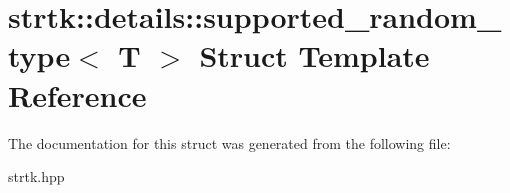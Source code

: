 \hypertarget{structstrtk_1_1details_1_1supported__random__type}{\section{strtk\-:\-:details\-:\-:supported\-\_\-random\-\_\-type$<$ T $>$ Struct Template Reference}
\label{structstrtk_1_1details_1_1supported__random__type}
}


The documentation for this struct was generated from the following file\-:\begin{DoxyCompactItemize}
\item 
strtk.\-hpp\end{DoxyCompactItemize}
